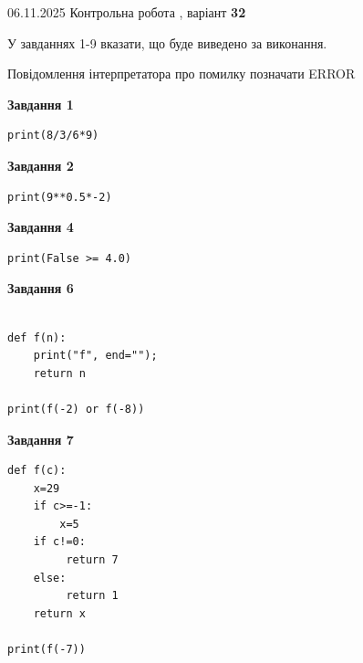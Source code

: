 \documentclass[12pt, ukrainian]{article}
\begin{document}
{\Large{06.11.2025 Контрольна робота , варіант  \No \textbf { 32 }\par}}
{
\begin {large}
У завданнях 1-9 вказати, що буде виведено за виконання.

Повідомлення інтерпретатора про помилку позначати ERROR

\begin{minipage}[t]{7.5cm}

\begin{center}
\textbf{Завдання 1}
\end{center}

\begin{verbatim}
print(8/3/6*9)
\end{verbatim}



\begin{center}
\textbf{Завдання 2}
\end{center}

\begin{verbatim}
print(9**0.5*-2)
\end{verbatim}



\begin{center}
\textbf{Завдання 4}
\end{center}

\begin{verbatim}
print(False >= 4.0)
\end{verbatim}



\begin{center}
\textbf{Завдання 6}
\end{center}

\begin{verbatim}

def f(n):
    print("f", end="");
    return n

print(f(-2) or f(-8))
\end{verbatim}



\begin{center}
\textbf{Завдання 7}
\end{center}

\begin{verbatim}
def f(c):
    x=29
    if c>=-1: 
        x=5
    if c!=0:
         return 7
    else:
         return 1
    return x

print(f(-7))
\end{verbatim}


\end{minipage}
\end{large}}
\end{document}
